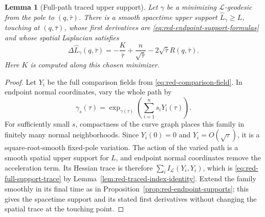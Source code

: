 \documentclass[10pt]{coll-l}
\newtheorem{lemma}[theorem]{Lemma}
\theoremstyle{definition}
\theoremstyle{remark}
\numberwithin{section}{chapter}
\numberwithin{equation}{chapter}
\begin{document}
\begin{lemma}[Full-path traced upper support]
\label{lem:red-full-path-support}
Let $\gamma$ be a minimizing $\mathcal L$-geodesic from the pole to
$(q,\bar\tau)$.  There is a smooth spacetime upper support
$\widehat L_\gamma\geq L$, touching at $(q,\bar\tau)$, whose first
derivatives are \eqref{eq:red-endpoint-support-formulas} and whose spatial
Laplacian satisfies
\begin{equation}
 \Delta\widehat L_\gamma(q,\bar\tau)
 =-\frac K{\bar\tau}+\frac n{\sqrt{\bar\tau}}
                    -2\sqrt{\bar\tau}R(q,\bar\tau).    \label{eq:red-full-support-trace}
\end{equation}
Here $K$ is computed along this chosen minimizer.
\end{lemma}

\begin{proof}
Let $Y_i$ be the full comparison fields from
\eqref{eq:red-comparison-field}.  In endpoint normal coordinates, vary the
whole path by
\begin{equation}
 \gamma_s(\tau)=\exp_{\gamma(\tau)}
                 \left(\sum_{i=1}^n s_iY_i(\tau)\right).  \label{eq:red-full-path-support-variation}
\end{equation}
For sufficiently small $s$, compactness of the curve graph places this
family in finitely many normal neighborhoods.  Since $Y_i(0)=0$ and
$Y_i=O(\sqrt\tau)$, it is a square-root-smooth fixed-pole variation.  The
action of the varied path is a smooth spatial upper support for $L$, and
endpoint normal coordinates remove the acceleration term.  Its Hessian
trace is therefore $\sum_iI_{\mathcal L}(Y_i,Y_i)$, which is
\eqref{eq:red-full-support-trace} by
Lemma~\ref{lem:red-traced-index-identity}.  Extend the family smoothly in
its final time as in Proposition~\ref{prop:red-endpoint-supports}; this gives
the spacetime support and its stated first derivatives without changing the
spatial trace at the touching point.
\end{proof}
\end{document}
